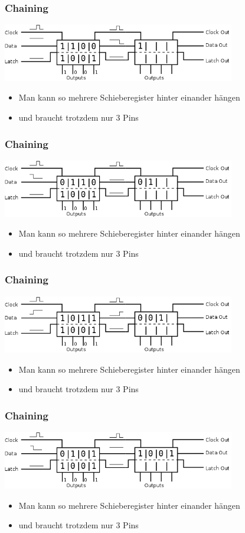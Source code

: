 \documentclass[ngerman,compress]{beamer}
\begin{document}
\begin{frame} [fragile]
	\frametitle{Chaining}
	\includegraphics[width=4in]{11_chaining.png}
	\begin{itemize}
		\item Man kann so mehrere Schieberegister hinter einander hängen
                \item und braucht trotzdem nur 3 Pins
	\end{itemize}
\end{frame}

\begin{frame} [fragile]
	\frametitle{Chaining}
	\includegraphics[width=4in]{12_chaining.png}
	\begin{itemize}
		\item Man kann so mehrere Schieberegister hinter einander hängen
                \item und braucht trotzdem nur 3 Pins
	\end{itemize}
\end{frame}

\begin{frame} [fragile]
	\frametitle{Chaining}
	\includegraphics[width=4in]{13_chaining.png}
	\begin{itemize}
		\item Man kann so mehrere Schieberegister hinter einander hängen
                \item und braucht trotzdem nur 3 Pins
	\end{itemize}
\end{frame}

\begin{frame} [fragile]
	\frametitle{Chaining}
	\includegraphics[width=4in]{14_chaining.png}
	\begin{itemize}
		\item Man kann so mehrere Schieberegister hinter einander hängen
                \item und braucht trotzdem nur 3 Pins
	\end{itemize}
\end{frame}
\end{document}
